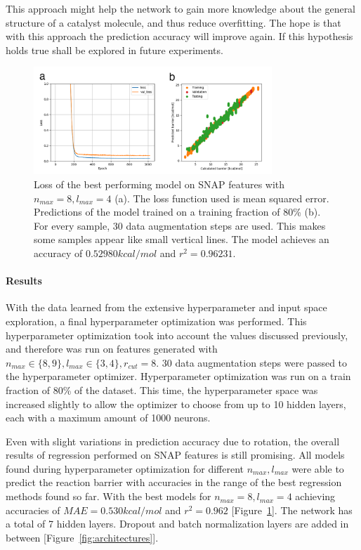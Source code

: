 This approach might help the network to gain more knowledge about the general structure of a catalyst molecule,
and thus reduce overfitting.
The hope is that with this approach the prediction accuracy will improve again.
If this hypothesis holds true shall be explored in future experiments.

\begin{figure}[H]
  \centering
  \includegraphics[width=0.8\textwidth]{figures/regression/snap/snap-result.png}
  \caption[Best performing model on SNAP features]{
    Loss of the best performing model on SNAP features with  $n_{max}=8, l_{max}=4$ (a). 
    The loss function used is mean squared error.
    Predictions of the model trained on a training fraction of 80\% (b). 
    For every sample, 30 data augmentation steps are used. This makes some samples appear like small vertical lines.
    The model achieves an accuracy of $0.52980 kcal/mol$ and $r^2 = 0.96231$.
  }
  \label{fig:snap_results}

\end{figure}


\paragraph{Results}

With the data learned from the extensive hyperparameter and input space exploration, a final hyperparameter
optimization was performed.
This hyperparameter optimization took into account the values discussed previously, and therefore was run on 
features  generated with $ n_{max} \in \{8,9\}, l_{max} \in \{3,4\}, r_{cut}=8$.
30 data augmentation steps were passed to the hyperparameter optimizer.
Hyperparameter optimization was run on a train fraction of 80\% of the dataset.
This time, the hyperparameter space was increased slightly to allow the optimizer
to choose from up to 10 hidden layers, each with a maximum amount of 1000 neurons.

Even with slight variations in prediction accuracy due to rotation, the overall results of regression performed on SNAP features is still promising.
All models found during hyperparameter optimization for different $n_{max}, l_{max}$ were able to predict the reaction barrier with accuracies in the
range of the best regression methods found so far.
With the best models for $n_{max}=8, l_{max}=4$ achieving accuracies of $MAE=0.530 kcal/mol$ and $r^2=0.962$ [Figure~\ref{fig:snap_results}].
The network has a total of 7 hidden layers.
Dropout and batch normalization layers are added in between [Figure~\ref{fig:architectures}].

